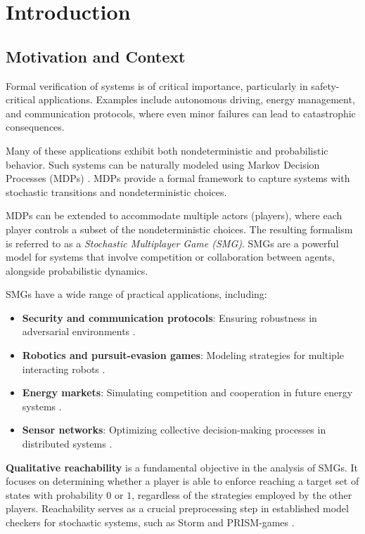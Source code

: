 \chapter{Introduction}
\label{chap:intro}

\section{Motivation and Context}
Formal verification of systems is of critical importance, particularly in safety-critical applications. Examples include autonomous driving, energy management, and communication protocols, where even minor failures can lead to catastrophic consequences.

Many of these applications exhibit both nondeterministic and probabilistic behavior. Such systems can be naturally modeled using Markov Decision Processes (MDPs) \cite{puterman_markov_2014}. MDPs provide a formal framework to capture systems with stochastic transitions and nondeterministic choices.

MDPs can be extended to accommodate multiple actors (players), where each player controls a subset of the nondeterministic choices. The resulting formalism is referred to as a \textit{Stochastic Multiplayer Game (SMG)}. SMGs are a powerful model for systems that involve competition or collaboration between agents, alongside probabilistic dynamics.

SMGs have a wide range of practical applications, including:
\begin{itemize}
    \item \textbf{Security and communication protocols}: Ensuring robustness in adversarial environments \cite{kremer_game-based_2001, park_lisp_2004, perrig_spins_2001, van_der_hoek_model_2003, wu_model_2005}.
    \item \textbf{Robotics and pursuit-evasion games}: Modeling strategies for multiple interacting robots \cite{hespanha_multiple-agent_1999}.
    \item \textbf{Energy markets}: Simulating competition and cooperation in future energy systems \cite{hildmann_influence_2011, chen_automatic_2013}.
    \item \textbf{Sensor networks}: Optimizing collective decision-making processes in distributed systems \cite{saffre_host_2012, chen_automatic_2013}.
\end{itemize}

\textbf{Qualitative reachability} is a fundamental objective in the analysis of SMGs. It focuses on determining whether a player is able to enforce reaching a target set of states with probability $0$ or $1$, regardless of the strategies employed by the other players. Reachability serves as a crucial preprocessing step in established model checkers for stochastic systems, such as Storm \cite{hensel_probabilistic_2020} and PRISM-games \cite{chen_automatic_2013}.

